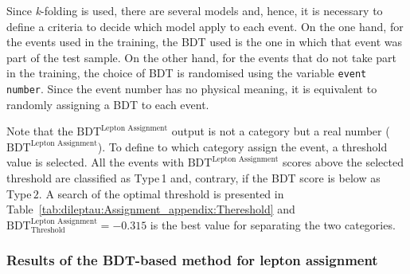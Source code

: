 Since \textit{k}-folding is used, there are several models and, hence, it is necessary to define a 
criteria to decide which model apply to each event. On the one hand, for the events used in the training, the BDT
used is the one in which that event was part of the test sample. On the other hand, for the events
that do not take part in the training, the choice of BDT is randomised using the variable \texttt{event number}.
Since the event number has no physical meaning, it is equivalent to randomly assigning a BDT to each event. 


Note that the $\text{BDT}^{\text{Lepton Assignment}}$
output is not a category but a real number ($\text{BDT}^{\text{Lepton Assignment}}$). To define
to which category assign the event, a threshold value is selected. All the events
with $\text{BDT}^{\text{Lepton Assignment}}$ scores above the selected threshold are classified as  Type$\,$1
and, contrary, if the BDT score is below as Type$\,2$. 
A search of the optimal threshold is presented in Table~\ref{tab:dileptau:Assignment_appendix:Thereshold}
and $\text{BDT}_{\text{Threshold}}^{\text{Lepton Assignment}} = -0.315$ is the best value for 
separating the two categories.


\begin{table}[h]
\centering
{}
\caption{Different studied $\text{BDT}^{\text{Lepton Assignment}}$ thresholds 
compared to its correspondent accuracy.
The first row is the value on the lepton-assignment-BDT-score threshold 
($\text{BDT}_{\text{Threshold}}^{\text{Lepton Assignment}}$) 
that is used to separate between 
Type$\,$1 and Type$\,$2 events. If for an event the score is larger than threshold value, the 
leading lepton is considered to come from the top quark. The accuracy on the second row is calculated
using the truth-level information.}
\label{tab:dileptau:Assignment_appendix:Thereshold}
\end{table}


\subsubsection{Results of the BDT-based method for lepton assignment}
\label{sec:ChaptH:Sig:LepAsign:SS:BDT:Results}


